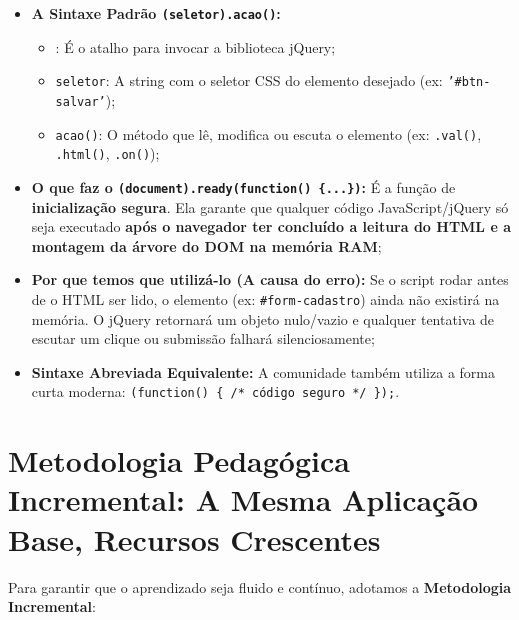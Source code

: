 \begin{itemize}
\item \textbf{A Sintaxe Padrão \texttt{\textdollar(seletor).acao()}:}
  \begin{itemize}
    \item \texttt{\textdollar}: É o atalho para invocar a biblioteca jQuery;
    \item \texttt{seletor}: A string com o seletor CSS do elemento desejado (ex: \texttt{'\#btn-salvar'});
    \item \texttt{acao()}: O método que lê, modifica ou escuta o elemento (ex: \texttt{.val()}, \texttt{.html()}, \texttt{.on()});
  \end{itemize}
\item \textbf{O que faz o \texttt{\textdollar(document).ready(function() \{...\})}:} É a função de \textbf{inicialização segura}. Ela garante que qualquer código JavaScript/jQuery só seja executado \textbf{após o navegador ter concluído a leitura do HTML e a montagem da árvore do DOM na memória RAM};
\item \textbf{Por que temos que utilizá-lo (A causa do erro):} Se o script rodar antes de o HTML ser lido, o elemento (ex: \texttt{\#form-cadastro}) ainda não existirá na memória. O jQuery retornará um objeto nulo/vazio e qualquer tentativa de escutar um clique ou submissão falhará silenciosamente;
\item \textbf{Sintaxe Abreviada Equivalente:} A comunidade também utiliza a forma curta moderna: \texttt{\textdollar(function() \{ /* código seguro */ \});}.
\end{itemize}

\section{Metodologia Pedagógica Incremental: A Mesma Aplicação Base, Recursos Crescentes}\label{sec:m2a}

Para garantir que o aprendizado seja fluido e contínuo, adotamos a \textbf{Metodologia Incremental}:

